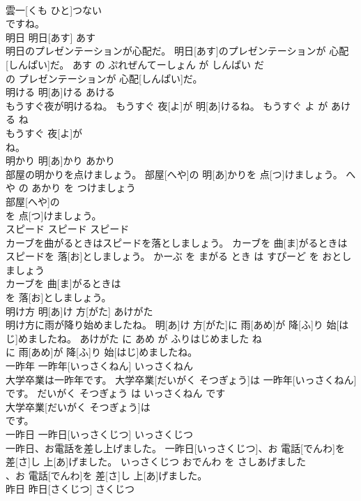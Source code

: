 \documentclass[8pt]{extreport}
\begin{document}
\begin{CJK}{UTF8}{min}
\\	雲一[くも ひと]つない
\\	ですね。			
\\	明日	明日[あす]	あす	
\\	明日のプレゼンテーションが心配だ。	明日[あす]のプレゼンテーションが 心配[しんぱい]だ。	あす の ぷれぜんてーしょん が しんぱい だ	
\\	の プレゼンテーションが 心配[しんぱい]だ。			
\\	明ける	明[あ]ける	あける	
\\	もうすぐ夜が明けるね。	もうすぐ 夜[よ]が 明[あ]けるね。	もうすぐ よ が あける ね	
\\	もうすぐ 夜[よ]が
\\	ね。			
\\	明かり	明[あ]かり	あかり	
\\	部屋の明かりを点けましょう。	部屋[へや]の 明[あ]かりを 点[つ]けましょう。	へや の あかり を つけましょう	
\\	部屋[へや]の
\\	を 点[つ]けましょう。			
\\	スピード	スピード	スピード	
\\	カーブを曲がるときはスピードを落としましょう。	カーブを 曲[ま]がるときはスピードを 落[お]としましょう。	かーぶ を まがる とき は すぴーど を おとしましょう	
\\	カーブを 曲[ま]がるときは
\\	を 落[お]としましょう。			
\\	明け方	明[あ]け 方[がた]	あけがた	
\\	明け方に雨が降り始めましたね。	明[あ]け 方[がた]に 雨[あめ]が 降[ふ]り 始[はじ]めましたね。	あけがた に あめ が ふりはじめました ね	
\\	に 雨[あめ]が 降[ふ]り 始[はじ]めましたね。			
\\	一昨年	一昨年[いっさくねん]	いっさくねん	
\\	大学卒業は一昨年です。	大学卒業[だいがく そつぎょう]は 一昨年[いっさくねん]です。	だいがく そつぎょう は いっさくねん です	
\\	大学卒業[だいがく そつぎょう]は
\\	です。			
\\	一昨日	一昨日[いっさくじつ]	いっさくじつ	
\\	一昨日、お電話を差し上げました。	一昨日[いっさくじつ]、お 電話[でんわ]を 差[さ]し 上[あ]げました。	いっさくじつ おでんわ を さしあげました	
\\	、お 電話[でんわ]を 差[さ]し 上[あ]げました。			
\\	昨日	昨日[さくじつ]	さくじつ	

\end{CJK}
\end{document}
